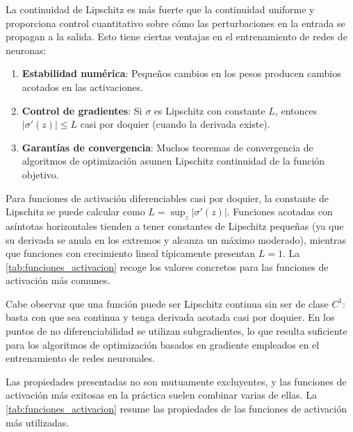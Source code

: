 La continuidad de Lipschitz es más fuerte que la continuidad uniforme y proporciona control cuantitativo sobre cómo las perturbaciones en la entrada se propagan a la salida. Esto tiene ciertas ventajas en el entrenamiento de redes de neuronas:

\begin{enumerate}
	\item \textbf{Estabilidad numérica}: Pequeños cambios en los pesos producen cambios acotados en las activaciones.
	\item \textbf{Control de gradientes}: Si $\sigma$ es Lipschitz con constante $L$, entonces $|\sigma'(z)| \leq L$ casi por doquier (cuando la derivada existe).
	\item \textbf{Garantías de convergencia}: Muchos teoremas de convergencia de algoritmos de optimización asumen Lipschitz continuidad de la función objetivo.
\end{enumerate}

Para funciones de activación diferenciables casi por doquier, la constante de Lipschitz se puede calcular como $L = \sup_{z} |\sigma'(z)|$. Funciones acotadas con asíntotas horizontales tienden a tener constantes de Lipschitz pequeñas (ya que su derivada se anula en los extremos y alcanza un máximo moderado), mientras que funciones con crecimiento lineal típicamente presentan $L = 1$. La \autoref{tab:funciones_activacion} recoge los valores concretos para las funciones de activación más comunes.

Cabe observar que una función puede ser Lipschitz continua sin ser de clase $C^1$: basta con que sea continua y tenga derivada acotada casi por doquier. En los puntos de no diferenciabilidad se utilizan subgradientes, lo que resulta suficiente para los algoritmos de optimización basados en gradiente empleados en el entrenamiento de redes neuronales.

Las propiedades presentadas no son mutuamente excluyentes, y las funciones de activación más exitosas en la práctica suelen combinar varias de ellas. La \autoref{tab:funciones_activacion} resume las propiedades de las funciones de activación más utilizadas.

